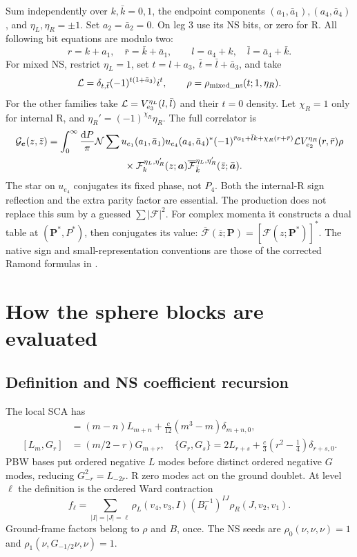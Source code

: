 \documentclass[11pt]{article}
\newcommand{\F}{\mathcal F}
\newcommand{\dd}{\mathrm d}
\newcommand{\barF}{\overline{\mathcal F}}
\begin{document}
Sum independently over \(k,\bar k=0,1\), the endpoint components
\((a_1,\bar a_1),(a_4,\bar a_4)\), and \(\eta_L,\eta_R=\pm1\).
Set \(a_2=\bar a_2=0\). On leg 3 use its NS bits, or zero for R.
All following bit equations are modulo two:
\[
 r=k+a_1,\quad\bar r=\bar k+\bar a_1,\qquad
 l=a_4+k,\quad\bar l=\bar a_4+\bar k.
\]
For mixed NS, restrict \(\eta_L=1\), set
\(t=l+a_3,\ \bar t=\bar l+\bar a_3\), and take
\[
 {\cal L}=\delta_{t,\bar t}(-1)^{t(1+\bar a_3)}i^t,\qquad
 \rho=\rho_{\rm mixed\_ns}(t;1,\eta_R).
\]
For the other families take
\({\cal L}=V_{e_3}^{\eta_L}(l,\bar l)\) and their \(t=0\) density.
Let \(\chi_R=1\) only for internal R, and
\(\eta_R'=(-1)^{\chi_R}\eta_R\). The full correlator is
\begin{align}
 {\cal G}_{\bm e}(z,\bar z)
 &=\int_0^\infty\frac{\dd P}{\pi}{\cal N}
 \sum u_{e_1}(a_1,\bar a_1)u_{e_4}(a_4,\bar a_4)^*
 (-1)^{\bar r a_1+\bar l k+\chi_R(r+\bar r)}
 {\cal L}V_{e_2}^{\eta_R}(r,\bar r)\rho\nonumber\\
 &\hspace{28mm}\times
 \F_k^{\eta_L,\eta_R'}(z;\bm a)
 \barF_{\bar k}^{\eta_L,\eta_R'}(\bar z;\bar{\bm a}).
 \label{eq:fullR}
\end{align}
The star on \(u_{e_4}\) conjugates its fixed phase, not \(P_4\).
Both the internal-R sign reflection and the extra parity factor are
essential. The production does not replace this sum by a guessed
\(\sum|\F|^2\). For complex momenta it constructs a dual table at
\((\bm P^*,P^*)\), then conjugates its value:
\(\barF(\bar z;\bm P)=[\F(z;\bm P^*)]^*\).
The native sign and small-representation conventions are those of
the corrected Ramond formulas in \cite{Suchanek,HJS}.

\section{How the sphere blocks are evaluated}
\subsection{Definition and NS coefficient recursion}
The local SCA has
\begin{align}
 [L_m,L_n]&=(m-n)L_{m+n}+\frac c{12}(m^3-m)\delta_{m+n,0},\\
 [L_m,G_r]&=(m/2-r)G_{m+r},\quad
 \{G_r,G_s\}=2L_{r+s}+\frac c3(r^2-\tfrac14)\delta_{r+s,0}.
\end{align}
PBW bases put ordered negative \(L\) modes before distinct ordered
negative \(G\) modes, reducing \(G_{-r}^2=L_{-2r}\).
R zero modes act on the ground doublet. At level \(\ell\) the
definition is the ordered Ward contraction
\begin{equation}
 f_\ell=\sum_{|I|=|J|=\ell}
 \rho_L(v_4,v_3,I)(B_\ell^{-1})^{IJ}\rho_R(J,v_2,v_1).
 \label{eq:gram}
\end{equation}
Ground-frame factors belong to \(\rho\) and \(B\), once.
The NS seeds are \(\rho_0(\nu,\nu,\nu)=1\) and
\(\rho_1(\nu,G_{-1/2}\nu,\nu)=1\).
\end{document}
